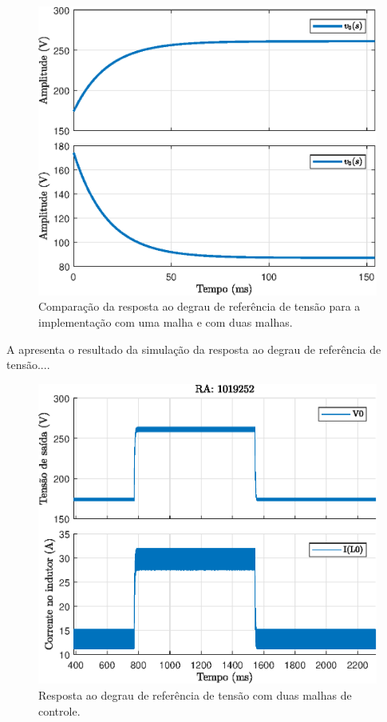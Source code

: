 \begin{figure}[!ht]
	\centering
	\includegraphics[width=0.9\linewidth]{Figs/BoostStepResponse2malhas}
	\caption{Comparação da resposta ao degrau de referência de tensão para a implementação com uma malha e com duas malhas.}
	\label{fig:BoostStepResponse2malhas}
\end{figure}


A  apresenta o resultado da simulação da resposta ao degrau de referência de tensão....

\begin{figure}[!ht]
	\centering
	\includegraphics[width=0.9\linewidth]{Figs/Boost2malhas}
	\caption{Resposta ao degrau de referência de tensão com duas malhas de controle.}
	\label{fig:Boost2malhas}
\end{figure}

